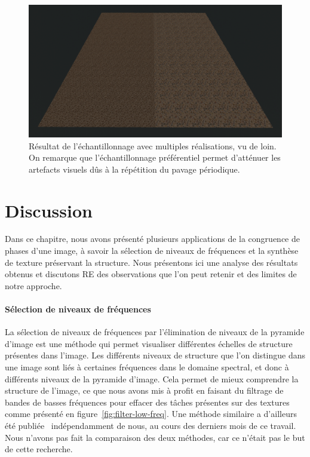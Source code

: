 \begin{figure}
    \centering
    \includegraphics[width=.9\textwidth]{contenu/resources/images/partitioned_sampling_pc_preserving_shuffle_uv_far}
    \caption{Résultat de l'échantillonnage avec multiples réalisations, vu de loin. On remarque que l'échantillonnage préférentiel permet d'atténuer les artefacts visuels dûs à la répétition du pavage périodique.}
    \label{fig:pc-preserving-synthesis}
\end{figure}


\section{Discussion}

Dans ce chapitre, nous avons présenté plusieurs applications de la congruence de phases d'une image, à savoir la sélection de niveaux de fréquences et la synthèse de texture préservant la structure. Nous présentons ici une analyse des résultats obtenus et discutons RE des observations que l'on peut retenir et des limites de notre approche.

\paragraph{Sélection de niveaux de fréquences}

La sélection de niveaux de fréquences par l'élimination de niveaux de la pyramide d'image est une méthode qui permet visualiser différentes échelles de structure présentes dans l'image. Les différents niveaux de structure que l'on distingue dans une image sont liés à certaines fréquences dans le domaine spectral, et donc à différents niveaux de la pyramide d'image. Cela permet de mieux comprendre la structure de l'image, ce que nous avons mis à profit en faisant du filtrage de bandes de basses fréquences pour effacer des \og tâches \fg présentes sur des textures comme présenté en figure~\ref{fig:filter-low-freq}. Une méthode similaire a d'ailleurs été publiée~\cite{zhang_pyramid_2023} indépendamment de nous, au cours des derniers mois de ce travail. Nous n'avons pas fait la comparaison des deux méthodes, car ce n'était pas le but de cette recherche.

